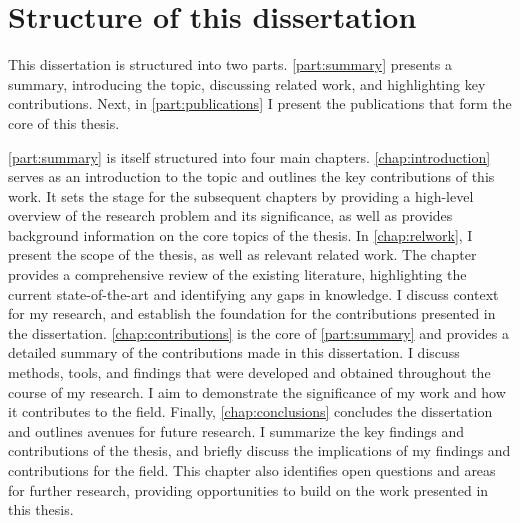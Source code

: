 \section{Structure of this dissertation}

This dissertation is structured into two parts.
\cref{part:summary} presents a summary, introducing the topic, discussing related work, and highlighting key contributions.
Next, in \cref{part:publications} I present the publications that form the core of this thesis.

\cref{part:summary} is itself structured into four main chapters.
\cref{chap:introduction} serves as an introduction to the topic and outlines the key contributions of this work.
It sets the stage for the subsequent chapters by providing a high-level overview of the research problem and its significance, as well as provides background information on the core topics of the thesis.
In \cref{chap:relwork}, I present the scope of the thesis, as well as relevant related work.
The chapter provides a comprehensive review of the existing literature, highlighting the current state-of-the-art and identifying any gaps in knowledge.
I discuss context for my research, and establish the foundation for the contributions presented in the dissertation.
\cref{chap:contributions} is the core of \cref{part:summary} and provides a detailed summary of the contributions made in this dissertation.
I discuss methods, tools, and findings that were developed and obtained throughout the course of my research.
I aim to demonstrate the significance of my work and how it contributes to the field.
Finally, \cref{chap:conclusions} concludes the dissertation and outlines avenues for future research.
I summarize the key findings and contributions of the thesis, and briefly discuss the implications of my findings and contributions for the field.
This chapter also identifies open questions and areas for further research, providing opportunities to build on the work presented in this thesis.